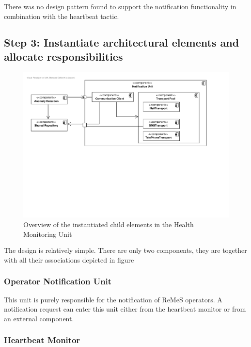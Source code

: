 \npar There was no design pattern found to support the notification
functionality in combination with the heartbeat tactic.

\subsection{Step 3: Instantiate architectural elements and allocate responsibilities}
\label{add:it9/elements}

\begin{figure}[H]
	\begin{centering}
		\includegraphics[width=\textwidth]{figs/add-it9-elements.pdf}
		\caption{Overview of the instantiated child elements in the Health Monitoring
		Unit}
		\label{fig:it9/elements}
	\end{centering}
\end{figure}

\npar The design is relatively simple. There are only two components, they are
together with all their associations depicted in figure
\subsubsection{Operator Notification Unit}

\npar This unit is purely responsible for the notification of ReMeS operators. A
notification request can enter this unit either from the heartbeat monitor or
from an external component.

\subsubsection{Heartbeat Monitor}

